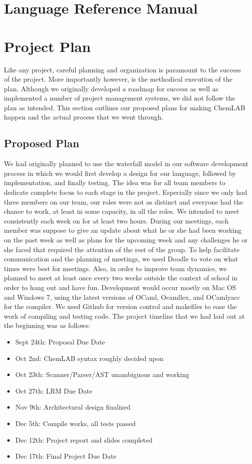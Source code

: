 \documentclass[11pt]{report}
\begin{document}
\chapter{Language Reference Manual}
\chapter{Project Plan}
Like any project, careful planning and organization is paramount to the success of the project. More importantly however, is the methodical execution of the plan. Although we originally developed a roadmap for success as well as implemented a number of project management systems, we did not follow the plan as intended. This section outlines our proposed plans for making ChemLAB happen and the actual process that we went through. 

\section{Proposed Plan}
We had originally planned to use the waterfall model in our software development process in which we would first develop a design for our language, followed by implementation, and finally testing. The idea was for all team members to dedicate complete focus to each stage in the project. Especially since we only had three members on our team, our roles were not as distinct and everyone had the chance to work, at least in some capacity, in all the roles. We intended to meet consistently each week on for at least two hours. During our meetings, each member was suppose to give an update about what he or she had been working on the past week as well as plans for the upcoming week and any challenges he or she faced that required the attention of the rest of the group. To help facilitate communication and the planning of meetings, we used Doodle to vote on what times were best for meetings. Also, in order to improve team dynamics, we planned to meet at least once every two weeks outside the context of school in order to hang out and have fun. Development would occur mostly on  Mac OS and Windows 7, using the latest versions of OCaml, Ocamllex, and OCamlyacc for the compiler.  We used Github for version control and makefiles to ease the work of compiling and testing code. The project timeline that we had laid out at the beginning was as follows:
\begin{itemize}
\item Sept 24th: Proposal Due Date
\item Oct 2nd: ChemLAB syntax roughly decided upon
\item Oct 23th: Scanner/Parser/AST unambiguous and working
\item Oct 27th: LRM Due Date
\item Nov 9th: Architectural design finalized
\item Dec 5th: Compile works, all tests passed
\item Dec 12th: Project report and slides completed 
\item Dec 17th: Final Project Due Date 
\end{itemize}
\end{document}

